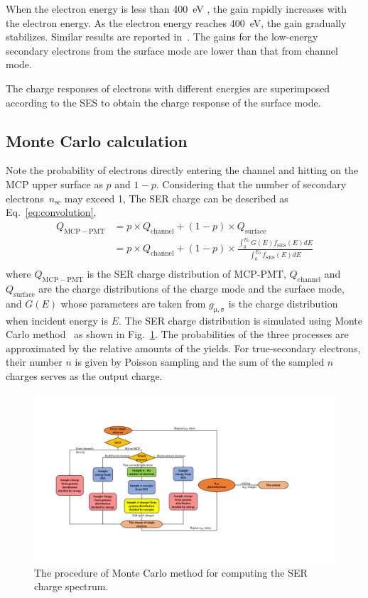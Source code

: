 When the electron energy is less than \SI{400}{eV} , the gain rapidly increases with the electron energy.
As the electron energy reaches \SI{400}{eV}, the gain gradually stabilizes.
Similar results are reported in~\cite{2017MCP}.
The gains for the low-energy secondary electrons
from the surface mode are lower than that from channel mode.

The charge responses of electrons with different energies are superimposed
according to the SES to obtain the charge response of the surface mode.

\subsection{Monte Carlo calculation}\label{sec:convolution}
Note the probability of electrons directly entering the channel and hitting on the MCP upper surface as $p$ and $1-p$.
Considering that the number of secondary electrons~$n_{\mathrm{se}}$ may exceed 1,
The SER charge can be described as Eq.~\eqref{eq:convolution},
\begin{equation}
    \label{eq:convolution}
    \begin{aligned}
        Q_{\mathrm{MCP-PMT}} & = p\times Q_{\mathrm{channel}}+(1-p)\times Q_{\mathrm{surface}}                                                            \\
                             & = p\times Q_{\mathrm{channel}}+(1-p)\times \frac{\int_0^{E_0}G(E)f_{\mathrm{SES}}(E)dE}{\int_0^{E_0}f_{\mathrm{SES}}(E)dE} \\
    \end{aligned}
\end{equation}
where $Q_{\mathrm{MCP-PMT}}$ is the SER charge distribution of MCP-PMT,
$Q_{\mathrm{channel}}$ and $Q_{\mathrm{surface}}$ are the charge distributions of the charge mode and the surface mode,
and $G(E)$ whose parameters are taken from $g_{\mathrm{\mu,\sigma}}$ is the charge distribution when incident energy is $E$.
The SER charge distribution is simulated using Monte Carlo method~\cite{1951Various} as shown in Fig.~\ref{fig:process}.
The probabilities of the three processes are approximated by the relative amounts of the yields.
For true-secondary electrons, their number $n$ is given by Poisson sampling and the sum of the sampled $n$ charges
serves as the output charge.
\begin{figure}[ht]
    \centering
    \includegraphics[width=0.95\linewidth]{pic/process.pdf}
    \caption{The procedure of Monte Carlo method for computing the SER charge spectrum.}
    \label{fig:process}
\end{figure}
